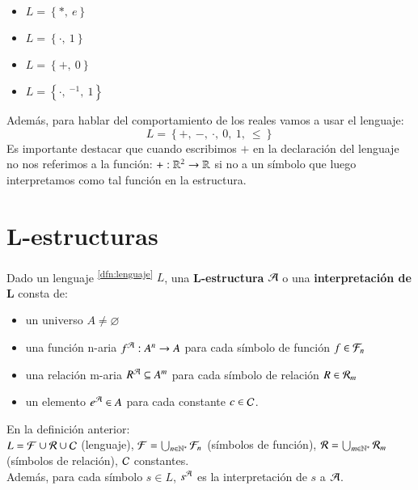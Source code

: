 \begin{eg}\label{eg:lenguajes}
    \begin{itemize}
        \item $L = \left\{\ast,\ e\right\}$
        \item $L = \left\{\cdot,\ 1\right\}$
        \item $L = \left\{+,\ 0\right\}$
        \item $L = \left\{\cdot,\ ^{-1},\ 1\right\}$
    \end{itemize}
    Además, para hablar del comportamiento de los reales vamos a usar el lenguaje:
    $$
        L = \left\{+,\ -,\ \cdot,\ 0,\ 1,\ \leq \right\}
    $$
    Es importante destacar que cuando escribimos $+$ en la declaración del lenguaje no nos referimos a la función: $+: \mathbb{R}^2 \to \mathbb{R}$ si no a un símbolo que luego interpretamos como tal función en la estructura.
\end{eg}

\section{L-estructuras}
\begin{dfn}[L-estructura]
    Dado un lenguaje \textsuperscript{\ref{dfn:lenguaje}} $L$, una \textbf{L-estructura} $\mathcal{A}$ o una \textbf{interpretaci\'on de L} consta de:
    \begin{itemize}
        \item un universo $A \neq \varnothing$
        \item una función n-aria $f^{\mathcal{A}} : A^n \to A$ para cada símbolo de función $f \in \mathcal{F}_n$
        \item una relación m-aria $R^{\mathcal{A}} \subseteq A^m$ para cada símbolo de relación $R \in \mathcal{R}_m$
        \item un elemento $e^{\mathcal{A}}\in A$ para cada constante $c \in \mathcal{C}$.
    \end{itemize}
\end{dfn}

\begin{nota}
    En la definición anterior:\\
    $L = \mathcal{F} \cup \mathcal{R} \cup \mathcal{C}$ (lenguaje), $\mathcal{F}=\bigcup_{n\in \mathbb{N}^*} \mathcal{F}_n$ (símbolos de función), $\mathcal{R}=\bigcup_{m\in \mathbb{N}^*} \mathcal{R}_m$ (símbolos de relación), $\mathcal{C}$ constantes.\\
    Además, para cada símbolo $s\in L$, $s^{\mathcal{A}}$ es la interpretación de $s$ a $\mathcal{A}$.
\end{nota}


